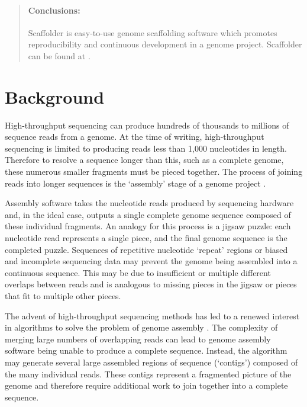\documentclass[10pt]{bmc_article}
\newenvironment{bmcformat}{\begin{raggedright}\baselineskip20pt\sloppy\setboolean{publ}{false}}{\end{raggedright}\baselineskip20pt\sloppy}
\begin{document}
\begin{bmcformat}
\begin{abstract}
  \paragraph*{Conclusions:} Scaffolder is easy-to-use genome scaffolding
  software which promotes reproducibility and continuous development in a
  genome project. Scaffolder can be found at \scaffolder.

\end{abstract}


\clearpage

\section*{Background} %

High-throughput sequencing can produce hundreds of thousands to millions of
sequence reads from a genome. At the time of writing, high-throughput
sequencing is limited to producing reads less than 1,000 nucleotides in
length. Therefore to resolve a sequence longer than this, such as a complete
genome, these numerous smaller fragments must be pieced together. The process
of joining reads into longer sequences is the `assembly' stage of a genome
project \cite{miller2010}. \pb

Assembly software takes the nucleotide reads produced by sequencing hardware
and, in the ideal case, outputs a single complete genome sequence composed of
these individual fragments. An analogy for this process is a jigsaw puzzle:
each nucleotide read represents a single piece, and the final genome sequence
is the completed puzzle. Sequences of repetitive nucleotide `repeat' regions
or biased and incomplete sequencing data may prevent the genome being
assembled into a continuous sequence. This may be due to insufficient or
multiple different overlaps between reads and is analogous to missing pieces
in the jigsaw or pieces that fit to multiple other pieces. \pb

The advent of high-throughput sequencing methods has led to a renewed interest
in algorithms to solve the problem of genome assembly \cite{pop2008,pop2009}.
The complexity of merging large numbers of overlapping reads can lead to
genome assembly software being unable to produce a complete sequence. Instead,
the algorithm may generate several large assembled regions of sequence
(`contigs') composed of the many individual reads. These contigs represent a
fragmented picture of the genome and therefore require additional work to join
together into a complete sequence. \pb


\end{bmcformat}
\end{document}
